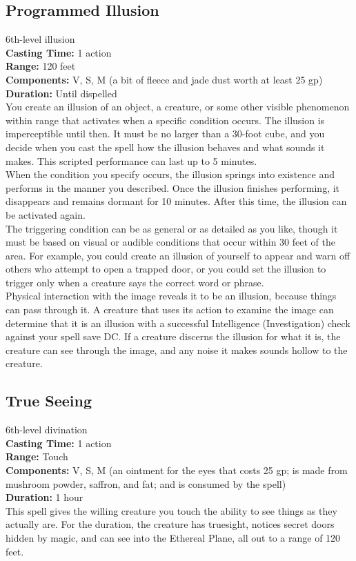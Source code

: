 \documentclass[11pt, A4paper, english]{article}
\begin{document}
		\subsection{Programmed Illusion}
6th-level illusion \\
\textbf{Casting Time:} 1 action \\
\textbf{Range:} 120 feet \\
\textbf{Components:} V, S, M (a bit of fleece and jade dust worth at least 25 gp) \\
\textbf{Duration:} Until dispelled \\
You create an illusion of an object, a creature, or some other visible phenomenon within range that activates when a specific condition occurs. The illusion is imperceptible until then. It must be no larger than a 30-foot cube, and you decide when you cast the spell how the illusion behaves and what sounds it makes. This scripted performance can last up to 5 minutes. \\
When the condition you specify occurs, the illusion springs into existence and performs in the manner you described. Once the illusion finishes performing, it disappears and remains dormant for 10 minutes. After this time, the illusion can be activated again. \\
The triggering condition can be as general or as detailed as you like, though it must be based on visual or audible conditions that occur within 30 feet of the area. For example, you could create an illusion of yourself to appear and warn off others who attempt to open a trapped door, or you could set the illusion to trigger only when a creature says the correct word or phrase. \\
Physical interaction with the image reveals it to be an illusion, because things can pass through it. A creature that uses its action to examine the image can determine that it is an illusion with a successful Intelligence (Investigation) check against your spell save DC. If a creature discerns the illusion for what it is, the creature can see through the image, and any noise it makes sounds hollow to the creature.

		\subsection{True Seeing}
6th-level divination \\
\textbf{Casting Time:} 1 action \\
\textbf{Range:} Touch \\
\textbf{Components:} V, S, M (an ointment for the eyes that costs 25 gp; is made from mushroom powder, saffron, and fat; and is consumed by the spell) \\
\textbf{Duration:} 1 hour \\
This spell gives the willing creature you touch the ability to see things as they actually are. For the duration, the creature has truesight, notices secret doors hidden by magic, and can see into the Ethereal Plane, all out to a range of 120 feet.
\end{document}
